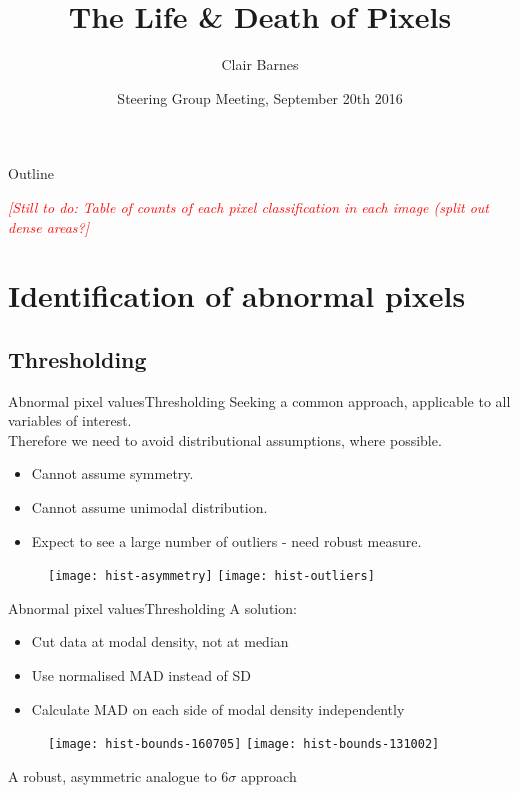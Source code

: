 \documentclass[8pt]{beamer}
\title{The Life \& Death of Pixels}
\author{Clair Barnes}
\institute[University of Warwick] %
{
  Department of Statistics \& WMG\\
  University of Warwick
}
\date{Steering Group Meeting, September 20th 2016}
\newcommand{\nb}[1]{\textcolor{red}{\textit{[#1]}}}
\begin{document}
\begin{frame}
  \titlepage
\end{frame}

\begin{frame}{Outline}

\nb{Still to do: Table of counts of each pixel classification in each image (split out dense areas?}

  \tableofcontents
\end{frame}


\section{Identification of abnormal pixels}

\subsection{Thresholding}

\begin{frame}{Abnormal pixel values}{Thresholding}
Seeking a common approach, applicable to all variables of interest. \\
Therefore we need to avoid distributional assumptions, where possible.
	\begin{itemize}
		\item Cannot assume symmetry.
		\item Cannot assume unimodal distribution.				%
		\item Expect to see a large number of outliers - need robust measure.		%
	\end{itemize}
	
	\begin{figure}[!ht]
		\texttt{[image: hist-asymmetry]}
		\texttt{[image: hist-outliers]}
	\end{figure}
\end{frame}


\begin{frame}{Abnormal pixel values}{Thresholding}
	A solution:
	\begin{itemize}
		\item Cut data at modal density, not at median
		\item Use normalised MAD instead of SD							%
		\item Calculate MAD on each side of modal density independently
	\end{itemize}
	
	\begin{figure}[!ht]
		\texttt{[image: hist-bounds-160705]}
		\texttt{[image: hist-bounds-131002]}
	\end{figure}
	A robust, asymmetric analogue to $6\sigma$ approach
	
\end{frame}
\end{document}
